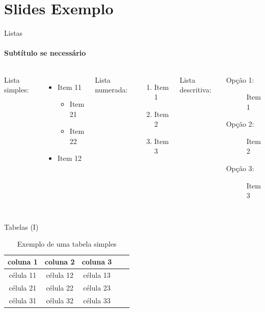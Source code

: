 \documentclass[
aspectratio=169,	%
LETI,				%
english,			%
]{DEEclassP}
\begin{document}
\section{Slides Exemplo}

\begin{frame}{Listas}
\framesubtitle{Subtítulo se necessário}

\begin{columns}

Lista simples:
\begin{itemize}
	\item Item 11
    \begin{itemize}
    	\item Item 21
  	    \item Item 22
  	\end{itemize}
  	\item Item 12
\end{itemize}  	    

Lista numerada:
\begin{enumerate}
	\item Item 1
    \item Item 2
  	\item Item 3
\end{enumerate} 

Lista descritiva:
\begin{description}
	\item [Opção 1:] Item 1
	\item [Opção 2:] Item 2
	\item [Opção 3:] Item 3
\end{description}
	
\end{columns}

\end{frame}

\begin{frame}{Tabelas (I)}

  
\begin{table}[h]							 
	\centering\label{tab1}
        \caption{Exemplo de uma tabela simples 	} 
	\begin{tabular}{ccccc}
	\toprule
	\textbf{coluna 1} & \textbf{coluna 2} & \textbf{coluna 3}\\
	\midrule
		célula 11 & célula 12 & célula 13\\ 
    	célula 21 & célula 22 & célula 23\\  
    	célula 31 & célula 32 & célula 33\\  
	\bottomrule
	\end{tabular}
\end{table}
\end{frame}
\end{document}
